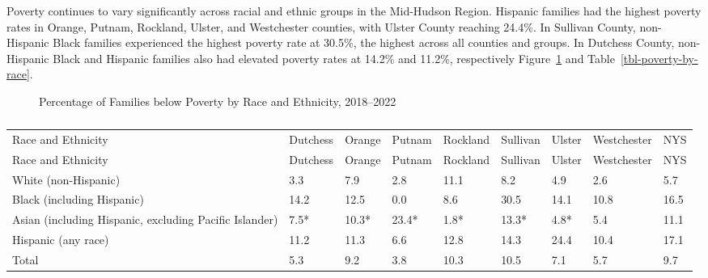 \documentclass[
  english,
  letterpaper,
]{report}
\begin{document}
Poverty continues to vary significantly across racial and ethnic groups
in the Mid-Hudson Region. Hispanic families had the highest poverty
rates in Orange, Putnam, Rockland, Ulster, and Westchester counties,
with Ulster County reaching 24.4\%. In Sullivan County, non-Hispanic
Black families experienced the highest poverty rate at 30.5\%, the
highest across all counties and groups. In Dutchess County, non-Hispanic
Black and Hispanic families also had elevated poverty rates at 14.2\%
and 11.2\%, respectively Figure~\ref{fig-poverty-by-race} and
Table~\ref{tbl-poverty-by-race}.

\begin{figure}


\caption{\label{fig-poverty-by-race}Percentage of Families below Poverty
by Race and Ethnicity, 2018--2022}

\end{figure}%

\begin{longtable}[]{@{}lllllllll@{}}

\caption{\label{tbl-poverty-by-race}Percentage of Families below Poverty
by Race and Ethnicity, 2018--2022}

\tabularnewline

\caption{}\label{T_40acb}\tabularnewline
\toprule\noalign{}
Race and Ethnicity & Dutchess & Orange & Putnam & Rockland & Sullivan &
Ulster & Westchester & NYS \\
\midrule\noalign{}
\endfirsthead
\toprule\noalign{}
Race and Ethnicity & Dutchess & Orange & Putnam & Rockland & Sullivan &
Ulster & Westchester & NYS \\
\midrule\noalign{}
\endhead
\bottomrule\noalign{}
\endlastfoot
White (non-Hispanic) & 3.3 & 7.9 & 2.8 & 11.1 & 8.2 & 4.9 & 2.6 & 5.7 \\
Black (including Hispanic) & 14.2 & 12.5 & 0.0 & 8.6 & 30.5 & 14.1 &
10.8 & 16.5 \\
Asian (including Hispanic, excluding Pacific Islander) & 7.5* & 10.3* &
23.4* & 1.8* & 13.3* & 4.8* & 5.4 & 11.1 \\
Hispanic (any race) & 11.2 & 11.3 & 6.6 & 12.8 & 14.3 & 24.4 & 10.4 &
17.1 \\
Total & 5.3 & 9.2 & 3.8 & 10.3 & 10.5 & 7.1 & 5.7 & 9.7 \\

\end{longtable}
\end{document}
